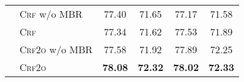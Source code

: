 \begin{table}[tb!]
\begin{tabular}{llcccc}
                             & \textsc{Crf} w/o MBR              & 77.40                   & 71.65                    & 77.17                            & 71.58                            \\
                             & \textsc{Crf}                      & 77.34                   & 71.62                    & 77.53\rlap{$^\ddagger$}          & 71.89\rlap{$^\ddagger$}          \\
                             & \textsc{Crf2o} w/o MBR            & 77.58                   & 71.92                    & 77.89                            & 72.25                            \\
                             & \textsc{Crf2o}                    & \textbf{78.08}          & \textbf{72.32}           & \textbf{78.02}\rlap{$^\ddagger$} & \textbf{72.33}\rlap{$^\ddagger$} \\
    \bottomrule
  \end{tabular}
  \label{table:dev-test}
\end{table}


